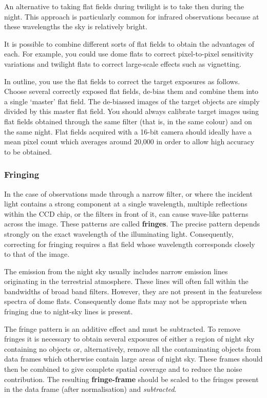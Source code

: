 \documentclass[twoside,11pt]{article}
\begin{document}
\begin{description}
   An alternative to taking flat fields during twilight is to take then
   during the night.  This approach is particularly common for infrared
   observations because at these wavelengths the sky is relatively bright.

\end{description}

It is possible to combine different sorts of flat fields to obtain the
advantages of each.  For example, you could use dome flats to correct
pixel-to-pixel sensitivity variations and twilight flats to correct
large-scale effects such as vignetting.

In outline, you use the flat fields to correct the target exposures
as follows.  Choose several correctly exposed flat fields, de-bias
them and combine them into a single `master' flat field.  The de-biassed
images of the target objects are simply divided by this master flat
field.  You should always calibrate target images using flat fields
obtained through the same filter (that is, in the same colour) and on the
same night.  Flat fields acquired with a 16-bit camera should ideally
have a mean pixel count which averages around 20,000 in order to allow
high accuracy to be obtained.

\subsubsection{Fringing}

In the case of observations made through a narrow filter, or where the
incident light contains a strong component at a single wavelength,
multiple reflections within the CCD chip, or the filters in front of it,
can cause wave-like patterns across the image.  These patterns are
called {\bf fringes}.  The precise pattern depends strongly on the
exact wavelength of the illuminating light.  Consequently, correcting for
fringing requires a flat field whose wavelength corresponds closely to that
of the image.

The emission from the night sky usually includes narrow emission lines
originating in the terrestrial atmosphere.  These lines will often fall
within the bandwidths of broad band filters.  However, they are not present
in the featureless spectra of dome flats.  Consequently dome flats may
not be appropriate when fringing due to night-sky lines is present.

The fringe pattern is an additive effect and must be subtracted. To
remove fringes it is necessary to obtain several exposures of either a
region of night sky containing no objects or, alternatively, remove all
the contaminating objects from data frames which otherwise contain large
areas of night sky.  These frames should then be combined to give complete
spatial coverage and to reduce the noise contribution.  The resulting
{\bf fringe-frame} should be scaled to the fringes present in the data
frame (after normalisation) and {\it subtracted}.
\end{document}
